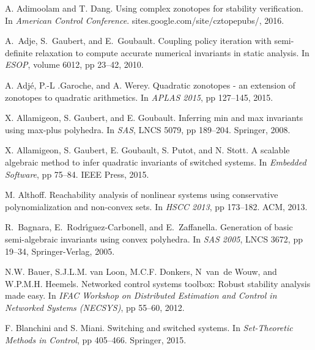 %
%



\begin{thebibliography}{10}

A. Adimoolam and T. Dang.
\newblock Using complex zonotopes for stability verification.
\newblock In {\em American Control Conference}.
  sites.google.com/site/cztopepubs/, 2016.

A.~Adje, S.~Gaubert, and E.~Goubault.
\newblock Coupling policy iteration with semi-definite relaxation to compute
  accurate numerical invariants in static analysis.
\newblock In {\em ESOP}, volume 6012, pp 23--42, 2010.

A. Adj{\'{e}}, P.{-}L .Garoche, and A. Werey.
\newblock Quadratic zonotopes - an extension of zonotopes to quadratic
  arithmetics.
\newblock In {\em APLAS 2015}, pp 127--145, 2015.

X. Allamigeon, S. Gaubert, and E. Goubault.
\newblock Inferring min and max invariants using max-plus polyhedra.
\newblock In {\em SAS}, LNCS 5079, pp 189--204.
  {Springer}, 2008.

X. Allamigeon, S. Gaubert, E. Goubault, S. Putot, and
  N. Stott.
\newblock A scalable algebraic method to infer quadratic invariants of switched
  systems.
\newblock In {\em Embedded
  Software}, pp 75--84. IEEE Press, 2015.

M. Althoff.
\newblock Reachability analysis of nonlinear systems using conservative
  polynomialization and non-convex sets.
\newblock In {\em HSCC 2013}, pp 173--182. ACM, 2013.

R.~Bagnara, E.~Rodr{\'\i}guez-Carbonell, and E.~Zaffanella.
\newblock Generation of basic semi-algebraic invariants using convex polyhedra.
\newblock In {\em SAS 2005},
LNCS 3672, pp 19--34, Springer-Verlag, 2005.

N.W. Bauer, S.J.L.M. van Loon, M.C.F. Donkers, N~van~de Wouw, and W.P.M.H.
  Heemels.
\newblock Networked control systems toolbox: Robust stability analysis made
  easy.
\newblock In {\em IFAC Workshop on Distributed Estimation and Control in
  Networked Systems (NECSYS)}, pp 55--60, 2012.

F. Blanchini and S. Miani.
\newblock Switching and switched systems.
\newblock In {\em Set-Theoretic Methods in Control}, pp 405--466. Springer,
  2015.


\end{thebibliography}
